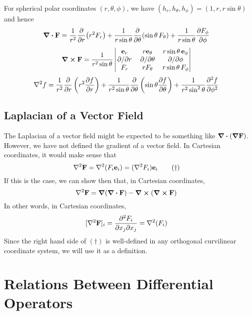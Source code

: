 \documentclass{article}
\begin{document}
For spherical polar coordinates $(r, \theta, \phi)$, we have $(h_r, h_\theta, h_\phi) = (1, r, r\sin\theta)$ and hence
\[ \div{\vb F} = \frac{1}{r^2} \pdv{r}(r^2 F_r) + \frac{1}{r\sin\theta} \pdv{\theta}(\sin \theta\, F_\theta) + \frac{1}{r\sin\theta} \pdv{F_\phi}{\phi} \]
\[ \curl{\vb F} = \frac{1}{r^2\sin\theta} \begin{vmatrix}
        \vb e_r  & r \vb e_\theta & r\sin\theta\, \vb e_\phi \\
        \pdv*{r} & \pdv*{\theta}  & \pdv*{\phi}              \\
        F_r      & r F_\theta     & r\sin\theta\, F_\phi
    \end{vmatrix} \]
\[ \laplacian{f} = \frac{1}{r^2} \pdv{r} \left( r^2 \pdv{f}{r} \right) + \frac{1}{r^2 \sin\theta} \pdv{\theta} \left( \sin \theta \pdv{f}{\theta} \right) + \frac{1}{r^2\sin^2 \theta} \pdv[2]{f}{\phi} \]

\subsection{Laplacian of a Vector Field}
The Laplacian of a vector field might be expected to be something like $\div(\grad {\vb F})$. However, we have not defined the gradient of a vector field. In Cartesian coordinates, it would make sense that
\begin{equation}
    \laplacian{\vb F} = \laplacian(F_i \vb e_i) = (\laplacian{F_i})\vb e_i
    \tag{$\dagger$}
\end{equation}
If this is the case, we can show then that, in Cartesian coordinates,
\[ \laplacian{\vb F} = \grad(\div{\vb F}) - \curl(\curl{\vb F}) \]
In other words, in Cartesian coordinates,
\[ [\laplacian{\vb F}]_i = \pdv{F_i}{x_j}{x_j} = \laplacian(F_i) \]
Since the right hand side of $(\dagger)$ is well-defined in any orthogonal curvilinear coordinate system, we will use it as a definition.

\section{Relations Between Differential Operators}
\end{document}
